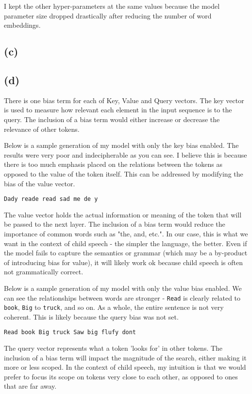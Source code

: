 \documentclass{article}  %
\begin{document}
	I kept the other hyper-parameters at the same values because the model parameter size dropped drastically after reducing the number of word embeddings.
	
	\subsection*{(c)}
	
	\subsection*{(d)}
	
	There is one bias term for each of Key, Value and Query vectors.
	\newline\newline
	The key vector is used to measure how relevant each element in the input sequence is to the query. The inclusion of a bias term would either increase or decrease the relevance of other tokens.
	
	Below is a sample generation of my model with only the key bias enabled. The results were very poor and indecipherable as you can see. I believe this is because there is too much emphasis placed on the relations between the tokens as opposed to the value of the token itself. This can be addressed by modifying the bias of the value vector.
	
	\verb|Dady reade read sad me de y|
	
	The value vector holds the actual information or meaning of the token that will be passed to the next layer. The inclusion of a bias term would reduce the importance of common words such as "the, and, etc.". In our case, this is what we want in the context of child speech - the simpler the language, the better. Even if the model fails to capture the semantics or grammar (which may be a by-product of introducing bias for value), it will likely work ok because child speech is often not grammatically correct.
	
	Below is a sample generation of my model with only the value bias enabled. We can see the relationships between words are stronger - \verb|Read| is clearly related to \verb|book|, \verb|Big| to \verb|truck|, and so on. As a whole, the entire sentence is not very coherent. This is likely because the query bias was not set.
	
	\verb|Read book Big truck Saw big flufy dont|
	
	The query vector represents what a token 'looks for' in other tokens. The inclusion of a bias term will impact the magnitude of the search, either making it more or less scoped. In the context of child speech, my intuition is that we would prefer to focus its scope on tokens very close to each other, as opposed to ones that are far away.
	
\end{document}
